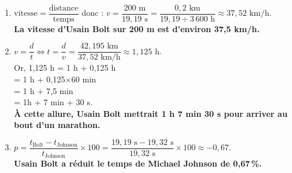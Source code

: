 \ \\ [-5mm]
\begin{enumerate}
   \item $\text{vitesse} =\dfrac{\text{distance}}{\text{temps}}$ donc : $v =\dfrac{200\text{ m}}{19,19\text{ s}} =\dfrac{0,2\text{ km}}{19,19\div3\,600\text{ h}} \approx37,52\text{ km/h}.$ \\ [1mm]
  {\bf La vitesse d'Usain Bolt sur 200 m est d'environ 37,5 km/h.} \\ [1mm]
   \item $v =\dfrac{d}{t} \iff t =\dfrac{d}{v} =\dfrac{42,195\text{ km}}{37,52\text{ km/h}} \approx1,125\text{ h}$. \\ [1mm]
   Or, 1,125 h = 1 h + 0,125 h \\
   \hspace*{1.8cm} = 1 h + 0,125$\times$60 min \\
   \hspace*{1.8cm} = 1 h + 7,5 min \\
   \hspace*{1.8cm} = 1h + 7 min + 30 s. \\
   {\bf À cette allure, Usain Bolt mettrait 1 h 7 min 30 s pour arriver au bout d'un marathon.} \\ [1mm]
   \item $p =\dfrac{t_{\text{Bolt}}-t_{\text{Johnson}}}{t_{\text{Johnson}}}\times100 =\dfrac{19,19\text{ s}-19,32\text{ s}}{19,32\text{ s}}\times100 \approx-0,67$. \\ [1mm]
   {\bf Usain Bolt a réduit le temps de Michael Johnson de 0,67\,\%.}
   \end{enumerate}

